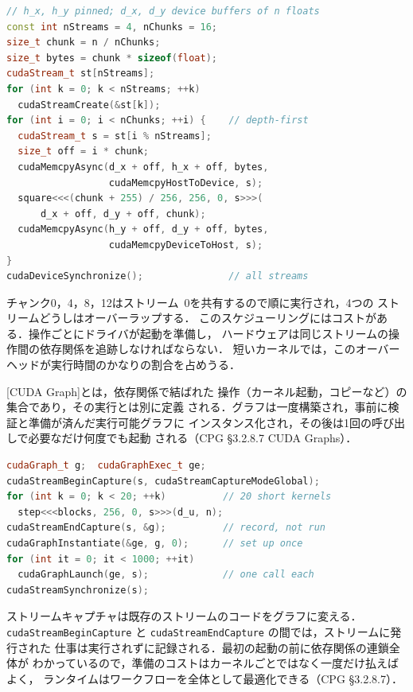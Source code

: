 \documentclass[../main.tex]{subfiles}
\begin{document}
\begin{lstlisting}[language=C++, numbers=none]
// h_x, h_y pinned; d_x, d_y device buffers of n floats
const int nStreams = 4, nChunks = 16;
size_t chunk = n / nChunks;
size_t bytes = chunk * sizeof(float);
cudaStream_t st[nStreams];
for (int k = 0; k < nStreams; ++k)
  cudaStreamCreate(&st[k]);
for (int i = 0; i < nChunks; ++i) {    // depth-first
  cudaStream_t s = st[i % nStreams];
  size_t off = i * chunk;
  cudaMemcpyAsync(d_x + off, h_x + off, bytes,
                  cudaMemcpyHostToDevice, s);
  square<<<(chunk + 255) / 256, 256, 0, s>>>(
      d_x + off, d_y + off, chunk);
  cudaMemcpyAsync(h_y + off, d_y + off, bytes,
                  cudaMemcpyDeviceToHost, s);
}
cudaDeviceSynchronize();               // all streams
\end{lstlisting}

チャンク0，4，8，12はストリーム~0を共有するので順に実行され，4つの
ストリームどうしはオーバーラップする．
このスケジューリングにはコストがある．操作ごとにドライバが起動を準備し，
ハードウェアは同じストリームの操作間の依存関係を追跡しなければならない．
短いカーネルでは，このオーバーヘッドが実行時間のかなりの割合を占めうる．

\begin{definition}[CUDAグラフ]
  [CUDA Graph]とは，依存関係で結ばれた
  操作（カーネル起動，コピーなど）の集合であり，その実行とは別に定義
  される．グラフは一度構築され，事前に検証と準備が済んだ実行可能グラフに
  インスタンス化され，その後は1回の呼び出しで必要なだけ何度でも起動
  される（CPG §3.2.8.7 CUDA Graphs）．
\end{definition}

\begin{lstlisting}[language=C++, numbers=none]
cudaGraph_t g;  cudaGraphExec_t ge;
cudaStreamBeginCapture(s, cudaStreamCaptureModeGlobal);
for (int k = 0; k < 20; ++k)          // 20 short kernels
  step<<<blocks, 256, 0, s>>>(d_u, n);
cudaStreamEndCapture(s, &g);          // record, not run
cudaGraphInstantiate(&ge, g, 0);      // set up once
for (int it = 0; it < 1000; ++it)
  cudaGraphLaunch(ge, s);             // one call each
cudaStreamSynchronize(s);
\end{lstlisting}
ストリームキャプチャは既存のストリームのコードをグラフに変える．
\texttt{cudaStream\allowbreak BeginCapture} と
\texttt{cudaStream\allowbreak EndCapture} の間では，ストリームに発行された
仕事は実行されずに記録される．最初の起動の前に依存関係の連鎖全体が
わかっているので，準備のコストはカーネルごとではなく一度だけ払えばよく，
ランタイムはワークフローを全体として最適化できる（CPG §3.2.8.7）．
\end{document}
